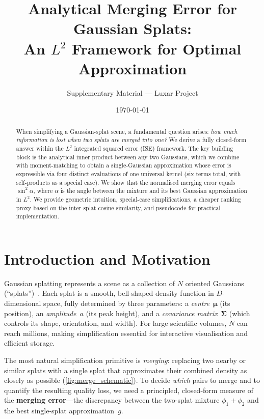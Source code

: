 \documentclass[11pt, a4paper]{article}
\title{\bfseries Analytical Merging Error for Gaussian Splats:\\
       An $L^2$ Framework for Optimal Approximation}
\author{Supplementary Material --- Luxar Project}
\date{\today}
\theoremstyle{plain}
\theoremstyle{definition}
\theoremstyle{remark}
\newcommand{\bmu}{\bm{\mu}}
\newcommand{\Sig}{\bm{\Sigma}}
\begin{document}
\maketitle

\begin{abstract}
When simplifying a Gaussian-splat scene, a fundamental question arises:
\emph{how much information is lost when two splats are merged into one?}
We derive a fully closed-form answer within the $L^2$ integrated squared
error (ISE) framework.  The key building block is the analytical inner
product between any two Gaussians, which we combine with
moment-matching to obtain a single-Gaussian approximation whose error
is expressible via four distinct evaluations of one universal
kernel (six terms total, with self-products as a special case).  We show
that the normalised merging error equals $\sin^2\!\alpha$, where
$\alpha$ is the angle between the mixture and its best Gaussian
approximation in $L^2$.  We provide geometric intuition,
special-case simplifications, a cheaper ranking proxy based on the
inter-splat cosine similarity, and pseudocode for practical
implementation.
\end{abstract}

\tableofcontents
\vspace{1em}

\section{Introduction and Motivation}\label{sec:intro}

Gaussian splatting represents a scene as a collection of $N$ oriented
Gaussians (``splats'')~\citep{kerbl2023}.  Each splat is a smooth,
bell-shaped density function in $D$-dimensional space, fully
determined by three parameters: a \emph{centre}~$\bmu$ (its position),
an \emph{amplitude}~$a$ (its peak height), and a \emph{covariance
matrix}~$\Sig$ (which controls its shape, orientation, and width).
For large scientific volumes, $N$ can reach millions, making
simplification essential for interactive visualisation and efficient
storage.

The most natural simplification primitive is \emph{merging}: replacing
two nearby or similar splats with a single splat that approximates
their combined density as closely as possible (\cref{fig:merge_schematic}).
To decide \emph{which} pairs to merge and to quantify the resulting
quality loss, we need a principled, closed-form measure of the
\textbf{merging error}---the discrepancy between the two-splat mixture
$\phi_1 + \phi_2$ and the best single-splat approximation~$g$.
\end{document}
